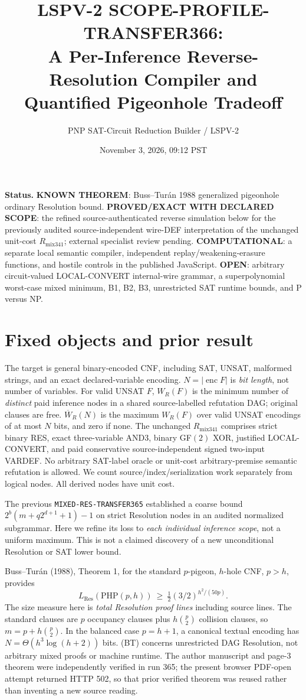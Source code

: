 \documentclass[11pt]{article}
\title{LSPV-2 SCOPE-PROFILE-TRANSFER366:\\A Per-Inference Reverse-Resolution Compiler and Quantified Pigeonhole Tradeoff}
\author{PNP SAT-Circuit Reduction Builder / LSPV-2}
\date{November 3, 2026, 09:12 PST}
\begin{document}
\maketitle

\noindent\textbf{Status.} \textbf{KNOWN THEOREM}: Buss--Tur\'an 1988 generalized pigeonhole ordinary Resolution bound. \textbf{PROVED/EXACT WITH DECLARED SCOPE}: the refined source-authenticated reverse simulation below for the previously audited source-independent wire-DEF interpretation of the unchanged unit-cost $R_{\mathrm{mix341}}$; external specialist review pending. \textbf{COMPUTATIONAL}: a separate local semantic compiler, independent replay/weakening-erasure functions, and hostile controls in the published JavaScript. \textbf{OPEN}: arbitrary circuit-valued LOCAL-CONVERT internal-wire grammar, a superpolynomial worst-case mixed minimum, B1, B2, B3, unrestricted SAT runtime bounds, and P versus NP.

\section*{Fixed objects and prior result}
The target is general binary-encoded CNF, including SAT, UNSAT, malformed strings, and an exact declared-variable encoding. $N=|\operatorname{enc}F|$ is \emph{bit length}, not number of variables. For valid UNSAT $F$, $W_R(F)$ is the minimum number of \emph{distinct} paid inference nodes in a shared source-labelled refutation DAG; original clauses are free. $\overline W_R(N)$ is the maximum $W_R(F)$ over valid UNSAT encodings of at most $N$ bits, and zero if none. The unchanged $R_{\mathrm{mix341}}$ comprises strict binary RES, exact three-variable AND3, binary GF$(2)$ XOR, justified LOCAL-CONVERT, and paid conservative source-independent signed two-input VARDEF. No arbitrary SAT-label oracle or unit-cost arbitrary-premise semantic refutation is allowed. We count source/index/serialization work separately from logical nodes. All derived nodes have unit cost.

The previous \texttt{MIXED-RES-TRANSFER365} established a coarse bound $2^b(m+q2^{d+1}+1)-1$ on strict Resolution nodes in an audited normalized subgrammar. Here we refine its loss to \emph{each individual inference scope}, not a uniform maximum. This is not a claimed discovery of a new unconditional Resolution or SAT lower bound.

Buss--Tur\'an (1988), Theorem 1, for the standard $p$-pigeon, $h$-hole CNF, $p>h$, provides
\[
L_{\mathrm{Res}}(\mathrm{PHP}(p,h))\ \ge\
\tfrac12(3/2)^{h^2/(50p)}.
\tag{BT}
\]
The size measure here is \emph{total Resolution proof lines} including source lines. The standard clauses are $p$ occupancy clauses plus $h\binom p2$ collision clauses, so $m=p+h\binom p2$. In the balanced case $p=h+1$, a canonical textual encoding has $N=\Theta(h^3\log(h+2))$ bits. (BT) concerns unrestricted DAG Resolution, not arbitrary mixed proofs or machine runtime. The author manuscript and page-3 theorem were independently verified in run 365; the present browser PDF-open attempt returned HTTP 502, so that prior verified theorem was reused rather than inventing a new source reading.
\end{document}
